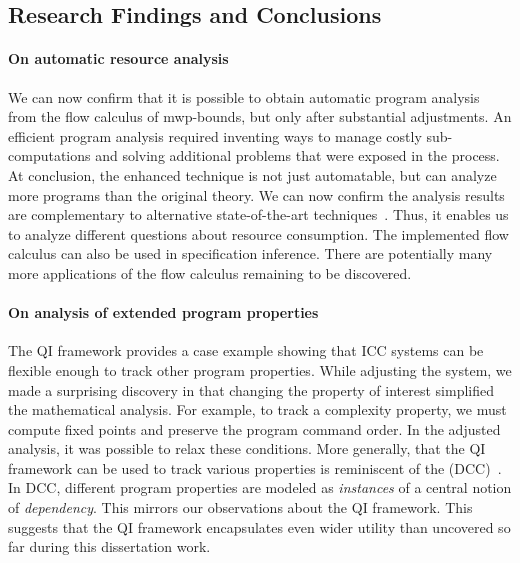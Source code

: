 \subsection{Research Findings and Conclusions}
\label{sec:aicc-discussion}

\paragraph*{On automatic resource analysis} We can now confirm that it is
possible to obtain automatic program analysis from the flow calculus of
mwp-bounds, but only after substantial adjustments. An efficient program
analysis required inventing ways to manage costly sub-computations and solving
additional problems that were exposed in the process. At conclusion, the
enhanced technique is not just automatable, but can analyze more programs than
the original theory. We can now confirm the analysis results are complementary
to alternative state-of-the-art techniques~\cite[p. 5]{aubert2023b}. Thus, it
enables us to analyze different questions about resource consumption. The
implemented flow calculus can also be used in specification
inference. There are potentially many more applications of
the flow calculus remaining to be discovered.

\paragraph*{On analysis of extended program properties} The QI framework
provides a case example showing that ICC systems can be flexible enough to track
other program properties. While adjusting the system, we made a surprising
discovery in that changing the property of interest simplified the mathematical
analysis. For example, to track a complexity property, we must compute fixed
points and preserve the program command order. In the adjusted analysis, it was
possible to relax these conditions. More generally, that the QI framework can be
used to track various properties is reminiscent of the  (DCC)~\cite{abadi1999b}. In DCC, different program properties are
modeled as \emph{instances} of a central notion of \emph{dependency}. This
mirrors our observations about the QI framework. This suggests that the QI
framework encapsulates even wider utility than uncovered so far during this
dissertation work.

